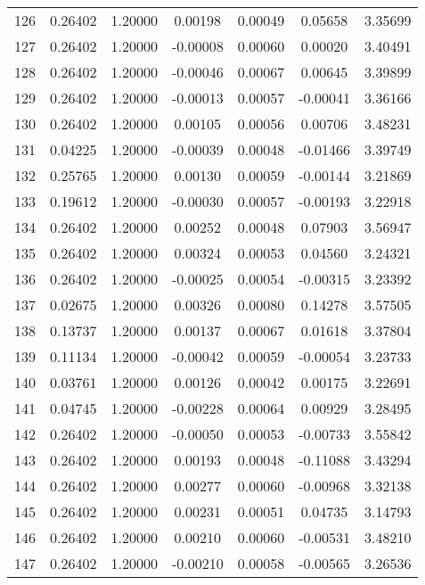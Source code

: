 \begin{longtable}{c c c c c c c}
126 &  0.26402 &      1.20000 &  0.00198 &   0.00049 &   0.05658 &   3.35699 \\
127 &  0.26402 &      1.20000 & -0.00008 &   0.00060 &   0.00020 &   3.40491 \\
128 &  0.26402 &      1.20000 & -0.00046 &   0.00067 &   0.00645 &   3.39899 \\
129 &  0.26402 &      1.20000 & -0.00013 &   0.00057 &  -0.00041 &   3.36166 \\
130 &  0.26402 &      1.20000 &  0.00105 &   0.00056 &   0.00706 &   3.48231 \\
131 &  0.04225 &      1.20000 & -0.00039 &   0.00048 &  -0.01466 &   3.39749 \\
132 &  0.25765 &      1.20000 &  0.00130 &   0.00059 &  -0.00144 &   3.21869 \\
133 &  0.19612 &      1.20000 & -0.00030 &   0.00057 &  -0.00193 &   3.22918 \\
134 &  0.26402 &      1.20000 &  0.00252 &   0.00048 &   0.07903 &   3.56947 \\
135 &  0.26402 &      1.20000 &  0.00324 &   0.00053 &   0.04560 &   3.24321 \\
136 &  0.26402 &      1.20000 & -0.00025 &   0.00054 &  -0.00315 &   3.23392 \\
137 &  0.02675 &      1.20000 &  0.00326 &   0.00080 &   0.14278 &   3.57505 \\
138 &  0.13737 &      1.20000 &  0.00137 &   0.00067 &   0.01618 &   3.37804 \\
139 &  0.11134 &      1.20000 & -0.00042 &   0.00059 &  -0.00054 &   3.23733 \\
140 &  0.03761 &      1.20000 &  0.00126 &   0.00042 &   0.00175 &   3.22691 \\
141 &  0.04745 &      1.20000 & -0.00228 &   0.00064 &   0.00929 &   3.28495 \\
142 &  0.26402 &      1.20000 & -0.00050 &   0.00053 &  -0.00733 &   3.55842 \\
143 &  0.26402 &      1.20000 &  0.00193 &   0.00048 &  -0.11088 &   3.43294 \\
144 &  0.26402 &      1.20000 &  0.00277 &   0.00060 &  -0.00968 &   3.32138 \\
145 &  0.26402 &      1.20000 &  0.00231 &   0.00051 &   0.04735 &   3.14793 \\
146 &  0.26402 &      1.20000 &  0.00210 &   0.00060 &  -0.00531 &   3.48210 \\
147 &  0.26402 &      1.20000 & -0.00210 &   0.00058 &  -0.00565 &   3.26536 \\

\end{longtable}
